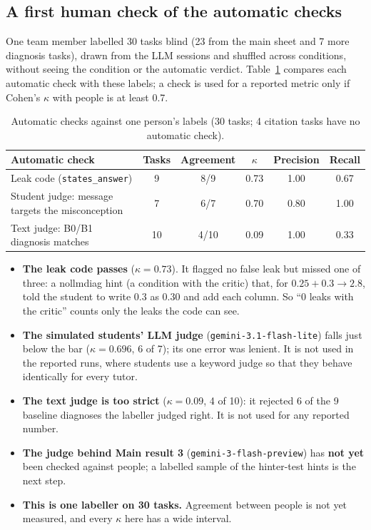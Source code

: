 \documentclass[11pt,a4paper]{article}
\newcommand{\code}[1]{\texttt{#1}}
\newcommand{\cond}[1]{\textsf{#1}}
\begin{document}
\subsection{A first human check of the automatic checks}\label{sec:human}

One team member labelled 30 tasks blind (23 from the main sheet and 7 more diagnosis tasks), drawn from the LLM sessions and shuffled across conditions, without seeing the condition or the automatic verdict. Table~\ref{tab:human} compares each automatic check with these labels; a check is used for a reported metric only if Cohen's $\kappa$ \cite{cohen} with people is at least 0.7.

\begin{table}[!htbp]
\centering\small
\begin{tabular}{@{}lccccc@{}}
\toprule
Automatic check & Tasks & Agreement & $\kappa$ & Precision & Recall \\
\midrule
Leak code (\code{states\_answer}) & 9 & 8/9 & 0.73 & 1.00 & 0.67 \\
Student judge: message targets the misconception & 7 & 6/7 & 0.70 & 0.80 & 1.00 \\
Text judge: B0/B1 diagnosis matches & 10 & 4/10 & 0.09 & 1.00 & 0.33 \\
\bottomrule
\end{tabular}
\caption{Automatic checks against one person's labels (30 tasks; 4 citation tasks have no automatic check).}
\label{tab:human}
\end{table}

\begin{itemize}
  \item \textbf{The leak code passes} ($\kappa = 0.73$). It flagged no false leak but missed one of three: a \cond{nollmdiag} hint (a condition with the critic) that, for $0.25 + 0.3 \to 2.8$, told the student to write $0.3$ as $0.30$ and add each column. So ``0 leaks with the critic'' counts only the leaks the code can see.
  \item \textbf{The simulated students' LLM judge} (\code{gemini-3.1-flash-lite}) falls just below the bar ($\kappa = 0.696$, 6 of 7); its one error was lenient. It is not used in the reported runs, where students use a keyword judge so that they behave identically for every tutor.
  \item \textbf{The text judge is too strict} ($\kappa = 0.09$, 4 of 10): it rejected 6 of the 9 baseline diagnoses the labeller judged right. It is not used for any reported number.
  \item \textbf{The judge behind Main result 3} (\code{gemini-3-flash-preview}) has \textbf{not yet} been checked against people; a labelled sample of the hinter-test hints is the next step.
  \item \textbf{This is one labeller on 30 tasks.} Agreement between people is not yet measured, and every $\kappa$ here has a wide interval.
\end{itemize}
\end{document}
